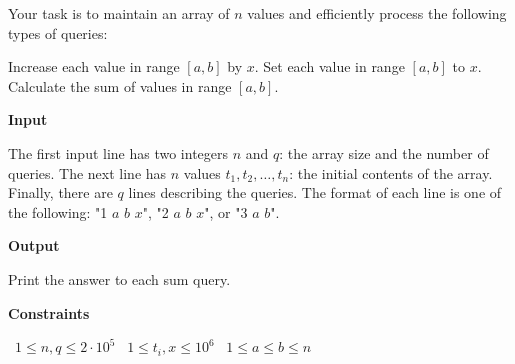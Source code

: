 Your task is to maintain an array of $n$ values and efficiently process the following types of queries:

Increase each value in range $[a,b]$ by $x$.
Set each value in range $[a,b]$ to $x$.
Calculate the sum of values in range $[a,b]$.

\vspace{0.3cm}\noindent\textbf{Input}

The first input line has two integers $n$ and $q$: the array size and the number of queries.
The next line has $n$ values $t_1,t_2,\dots,t_n$: the initial contents of the array.
Finally, there are $q$ lines describing the queries. The format of each line is one of the following: "1 $a$ $b$ $x$",  "2 $a$ $b$ $x$", or "3 $a$ $b$".

\vspace{0.3cm}\noindent\textbf{Output}

Print the answer to each sum query.

\vspace{0.3cm}\noindent\textbf{Constraints}

\textbullet\ $1 \le n, q \le 2 \cdot 10^5$
\textbullet\ $1 \le t_i, x \le 10^6$
\textbullet\ $1 \le a \le b \le n$